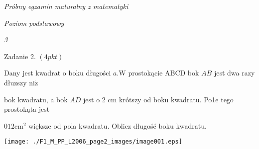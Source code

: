 \documentclass[a4paper,12pt]{article}
\begin{document}
{\it Próbny egzamin maturalny z matematyki}

{\it Poziom podstawowy}

{\it 3}

Zadanie 2. $(4pkt)$

Dany jest kwadrat o boku długości $a. \mathrm{W}$ prostokącie ABCD bok $AB$ jest dwa razy dłuzszy $\mathrm{n}\mathrm{i}\dot{\mathrm{z}}$

bok kwadratu, a bok $AD$ jest o 2 cm krótszy od boku kwadratu. Po1e tego prostokąta jest

$012\mathrm{c}\mathrm{m}^{2}$ większe od pola kwadratu. Oblicz długość boku kwadratu.
\begin{center}
\texttt{[image: ./F1\_M\_PP\_L2006\_page2\_images/image001.eps]}
\end{center}
\end{document}
